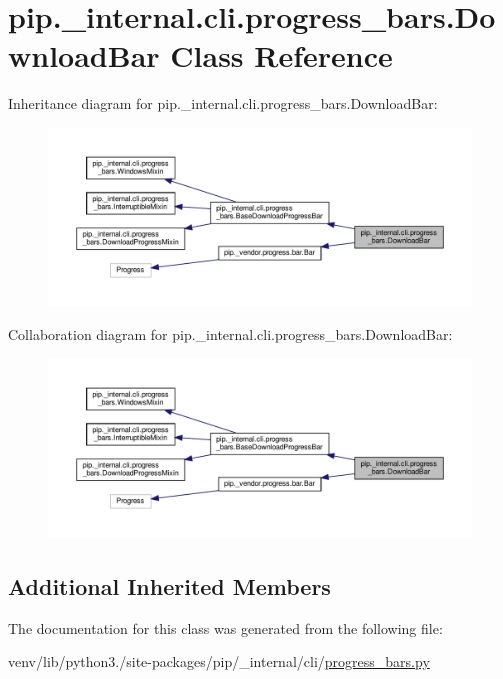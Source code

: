 \hypertarget{classpip_1_1__internal_1_1cli_1_1progress__bars_1_1DownloadBar}{}\section{pip.\+\_\+internal.\+cli.\+progress\+\_\+bars.\+Download\+Bar Class Reference}
\label{classpip_1_1__internal_1_1cli_1_1progress__bars_1_1DownloadBar}


Inheritance diagram for pip.\+\_\+internal.\+cli.\+progress\+\_\+bars.\+Download\+Bar\+:
\nopagebreak
\begin{figure}[H]
\begin{center}
\leavevmode
\includegraphics[width=350pt]{classpip_1_1__internal_1_1cli_1_1progress__bars_1_1DownloadBar__inherit__graph}
\end{center}
\end{figure}


Collaboration diagram for pip.\+\_\+internal.\+cli.\+progress\+\_\+bars.\+Download\+Bar\+:
\nopagebreak
\begin{figure}[H]
\begin{center}
\leavevmode
\includegraphics[width=350pt]{classpip_1_1__internal_1_1cli_1_1progress__bars_1_1DownloadBar__coll__graph}
\end{center}
\end{figure}
\subsection*{Additional Inherited Members}


The documentation for this class was generated from the following file\+:\begin{DoxyCompactItemize}
\item 
venv/lib/python3./site-\/packages/pip/\+\_\+internal/cli/\hyperlink{progress__bars_8py}{progress\+\_\+bars.\+py}\end{DoxyCompactItemize}

